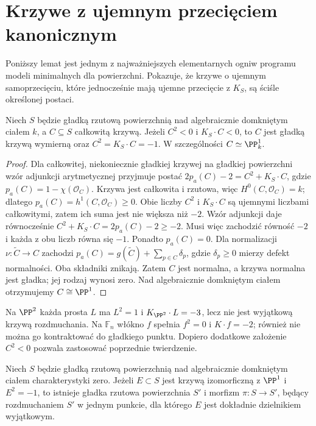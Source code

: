 \section{Krzywe z ujemnym przecięciem kanonicznym}
\label{sec:ga8-negative-curves}

Poniższy lemat jest jednym z najważniejszych elementarnych
ogniw programu modeli minimalnych dla powierzchni.
Pokazuje, że krzywe o ujemnym samoprzecięciu, które
jednocześnie mają ujemne przecięcie z $K_S$, są
ściśle określonej postaci.

\begin{twierdzenie}
\label{tw:ga8-negative-implies-minusone}
Niech $S$ będzie gładką rzutową powierzchnią nad
algebraicznie domkniętym ciałem $k$, a $C\subseteq S$
całkowitą krzywą. Jeżeli $C^2<0$ i $K_S\cdot C<0$,
to $C$ jest gładką krzywą wymierną oraz
$C^2=K_S\cdot C=-1$. W szczególności
$C\simeq\PP^1_k$.
\end{twierdzenie}
\begin{proof}
Dla całkowitej, niekoniecznie gładkiej krzywej
na gładkiej powierzchni wzór adjunkcji arytmetycznej
przyjmuje postać
$2p_a(C)-2=C^2+K_S\cdot C$, gdzie
$p_a(C)=1-\chi(\mathcal O_C)$.
Krzywa jest całkowita i rzutowa, więc
$H^0(C,\mathcal O_C)=k$; dlatego
$p_a(C)=h^1(C,\mathcal O_C)\ge0$.
Obie liczby $C^2$ i $K_S\cdot C$ są ujemnymi
liczbami całkowitymi, zatem ich suma jest nie
większa niż $-2$. Wzór adjunkcji daje równocześnie
$C^2+K_S\cdot C=2p_a(C)-2\ge-2$.
Musi więc zachodzić równość $-2$ i każda z obu
liczb równa się $-1$. Ponadto $p_a(C)=0$.
Dla normalizacji $\nu:\widetilde C\to C$ zachodzi
$p_a(C)=g(\widetilde C)+\sum_{p\in C}\delta_p$,
gdzie $\delta_p\ge0$ mierzy defekt normalności.
Oba składniki znikają. Zatem $C$ jest normalna,
a krzywa normalna jest gładka; jej rodzaj wynosi zero.
Nad algebraicznie domkniętym ciałem otrzymujemy
$C\cong\PP^1$.
\end{proof}

\begin{przyklad}
Na $\PP^2$ każda prosta $L$ ma $L^2=1$ i
$K_{\PP^2}\cdot L=-3$, lecz nie jest wyjątkową
krzywą rozdmuchania. Na $\mathbb F_n$ włókno $f$
spełnia $f^2=0$ i $K\cdot f=-2$; również nie
można go kontraktować do gładkiego punktu.
Dopiero dodatkowe założenie $C^2<0$ pozwala
zastosować poprzednie twierdzenie.
\end{przyklad}

\begin{twierdzenie}
\label{tw:ga8-castelnuovo-mmp}
Niech $S$ będzie gładką rzutową powierzchnią nad
algebraicznie domkniętym ciałem charakterystyki zero.
Jeżeli $E\subset S$ jest krzywą izomorficzną z $\PP^1$
i $E^2=-1$, to istnieje gładka rzutowa powierzchnia
$S'$ i morfizm $\pi:S\to S'$, będący rozdmuchaniem
$S'$ w jednym punkcie, dla którego $E$ jest dokładnie
dzielnikiem wyjątkowym.
\end{twierdzenie}

